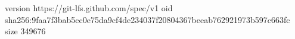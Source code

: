 version https://git-lfs.github.com/spec/v1
oid sha256:9faa7f3bab5cc0e75da9cf4de234037f20804367beeab762921973b597c663fc
size 349676
